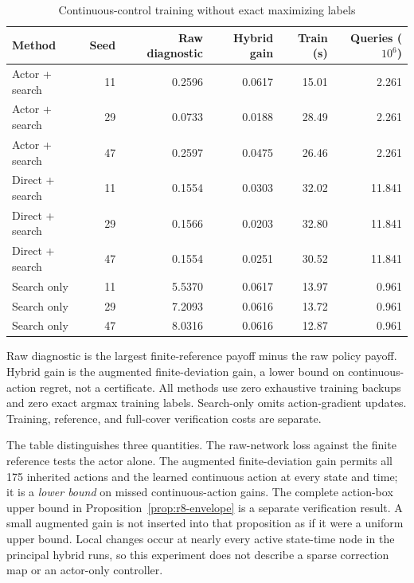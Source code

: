 \begin{table}[htbp]\centering
\caption{Continuous-control training without exact maximizing labels}
\begin{small}\begin{tabular}{lrrrrr}
\toprule
Method & Seed & Raw diagnostic & Hybrid gain & Train (s) & Queries ($10^6$) \\
\midrule
Actor + search & 11 & 0.2596 & 0.0617 & 15.01 & 2.261 \\
Actor + search & 29 & 0.0733 & 0.0188 & 28.49 & 2.261 \\
Actor + search & 47 & 0.2597 & 0.0475 & 26.46 & 2.261 \\
Direct + search & 11 & 0.1554 & 0.0303 & 32.02 & 11.841 \\
Direct + search & 29 & 0.1566 & 0.0203 & 32.80 & 11.841 \\
Direct + search & 47 & 0.1554 & 0.0251 & 30.52 & 11.841 \\
Search only & 11 & 5.5370 & 0.0617 & 13.97 & 0.961 \\
Search only & 29 & 7.2093 & 0.0616 & 13.72 & 0.961 \\
Search only & 47 & 8.0316 & 0.0616 & 12.87 & 0.961 \\
\bottomrule\end{tabular}\end{small}
\par\smallskip\begin{minipage}{0.96\linewidth}\footnotesize Raw diagnostic is the largest finite-reference payoff minus the raw policy payoff. Hybrid gain is the augmented finite-deviation gain, a lower bound on continuous-action regret, not a certificate. All methods use zero exhaustive training backups and zero exact argmax training labels. Search-only omits action-gradient updates. Training, reference, and full-cover verification costs are separate.\end{minipage}
\end{table}


The table distinguishes three quantities. The raw-network loss against the finite reference tests the actor alone. The augmented finite-deviation gain permits all 175 inherited actions and the learned continuous action at every state and time; it is a \emph{lower bound} on missed continuous-action gains. The complete action-box upper bound in Proposition~\ref{prop:r8-envelope} is a separate verification result. A small augmented gain is not inserted into that proposition as if it were a uniform upper bound. Local changes occur at nearly every active state-time node in the principal hybrid runs, so this experiment does not describe a sparse correction map or an actor-only controller.


